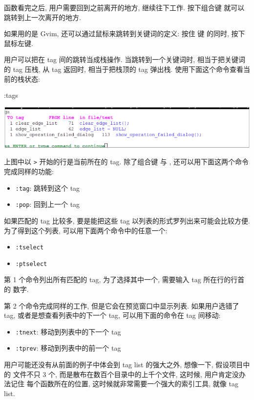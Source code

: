 函数看完之后, 用户需要回到之前离开的地方, 继续往下工作. 按下组合键
 就可以跳转到上一次离开的地方.

\begin{warning}
    如果用的是 Gvim, 还可以通过鼠标来跳转到关键词的定义: 按住  键
    的同时, 按下鼠标左键.
\end{warning}
用户可以把在 tag 间的跳转当成栈操作. 当跳转到一个关键词时, 相当于把关键词的 tag 
压栈, 从 tag 返回时, 相当于把栈顶的 tag 弹出栈.
使用下面这个命令查看当前的栈状态:
\begin{vimcode}
:tags
\end{vimcode}
\begin{center}
    \includegraphics[scale=0.5]{./images/page82.png}
\end{center}
上图中以 \texttt{>} 开始的行是当前所在的 tag. 除了组合键 \key{Ctrl+]}
与 , 还可以用下面这两个命令完成同样的功能:
\begin{itemize}
    \item \texttt{:tag}: 跳转到这个 tag
    \item \texttt{:pop}: 回到上一个 tag
\end{itemize}

如果匹配的 tag 比较多, 要是能把这些 tag 以列表的形式罗列出来可能会比较方便.
为了得到这个列表, 可以用下面两个命令中的任意一个:
\begin{itemize}
    \item \texttt{:tselect}
    \item \texttt{:ptselect}
\end{itemize}
第 1 个命令列出所有匹配的 tag, 为了选择其中一个, 需要输入 tag 所在行的行首的
数字.

第 2 个命令完成同样的工作, 但是它会在预览窗口中显示列表. 如果用户选错了 tag,
或者是想查看列表中的下一个 tag, 可以用下面的命令在 tag 间移动:
\begin{itemize}
    \item \texttt{:tnext}: 移动到列表中的下一个 tag
    \item \texttt{:tprev}: 移动到列表中的前一个 tag
\end{itemize}

用户可能还没有从前面的例子中体会到 tag list 的强大之外, 想像一下, 假设项目中的
文件不只 3 个, 而是散布在数百个目录中的上千个文件, 这时候, 用户肯定没办法记住
每个函数所在的位置, 这时候就非常需要一个强大的索引工具, 就像 tag list.
